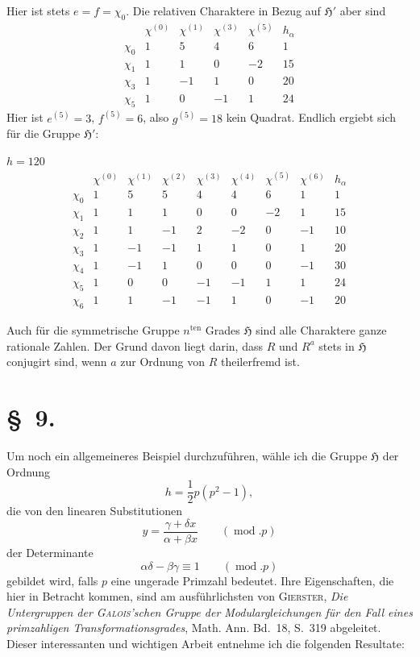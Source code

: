\documentclass[11pt]{article}
\newcommand{\grp}{\mathfrak{H}}
\begin{document}
Hier ist stets $e=f=\chi_0$. Die relativen Charaktere in Bezug auf $\grp'$ aber sind
\[
\begin{array}{c|rrrr|r}
 & \chi^{(0)} & \chi^{(1)} & \chi^{(3)} & \chi^{(5)} & h_\alpha\\ \hline
\chi_0 & 1 & 5 & 4 & 6 & 1\\
\chi_1 & 1 & 1 & 0 & -2 & 15\\
\chi_3 & 1 & -1 & 1 & 0 & 20\\
\chi_5 & 1 & 0 & -1 & 1 & 24
\end{array}
\]
Hier ist $e^{(5)}=3$, $f^{(5)}=6$, also $g^{(5)}=18$ kein Quadrat. Endlich ergiebt sich für die Gruppe $\grp'$:

\begin{center}
$h=120$
\[
\begin{array}{c|rrrrrrr|r}
 & \chi^{(0)} & \chi^{(1)} & \chi^{(2)} & \chi^{(3)} & \chi^{(4)} & \chi^{(5)} & \chi^{(6)} & h_\alpha\\ \hline
\chi_0 & 1 & 5 & 5 & 4 & 4 & 6 & 1 & 1\\
\chi_1 & 1 & 1 & 1 & 0 & 0 & -2 & 1 & 15\\
\chi_2 & 1 & 1 & -1 & 2 & -2 & 0 & -1 & 10\\
\chi_3 & 1 & -1 & -1 & 1 & 1 & 0 & 1 & 20\\
\chi_4 & 1 & -1 & 1 & 0 & 0 & 0 & -1 & 30\\
\chi_5 & 1 & 0 & 0 & -1 & -1 & 1 & 1 & 24\\
\chi_6 & 1 & 1 & -1 & -1 & 1 & 0 & -1 & 20
\end{array}
\]
\end{center}

Auch für die symmetrische Gruppe $n^{\text{ten}}$ Grades $\grp$ sind alle Charaktere ganze rationale Zahlen. Der Grund davon liegt darin, dass $R$ und $R^a$ stets in $\grp$ conjugirt sind, wenn $a$ zur Ordnung von $R$ theilerfremd ist.

\section*{\S~9.}

Um noch ein allgemeineres Beispiel durchzuführen, wähle ich die Gruppe $\grp$ der Ordnung
\begin{equation*}\tag{1.}
h=\frac{1}{2}p(p^2-1),
\end{equation*}
die von den linearen Substitutionen
\begin{equation*}\tag{2.}
y=\frac{\gamma+\delta x}{\alpha+\beta x}\qquad(\operatorname{mod}.p)
\end{equation*}
der Determinante
\begin{equation*}\tag{3.}
\alpha\delta-\beta\gamma\equiv 1\qquad(\operatorname{mod}.p)
\end{equation*}
gebildet wird, falls $p$ eine ungerade Primzahl bedeutet. Ihre Eigenschaften, die hier in Betracht kommen, sind am ausführlichsten von \textsc{Gierster}, \emph{Die Untergruppen der \textsc{Galois}'schen Gruppe der Modulargleichungen für den Fall eines primzahligen Transformationsgrades}, Math. Ann. Bd.~18, S.~319 abgeleitet. Dieser interessanten und wichtigen Arbeit entnehme ich die folgenden Resultate:
\end{document}
